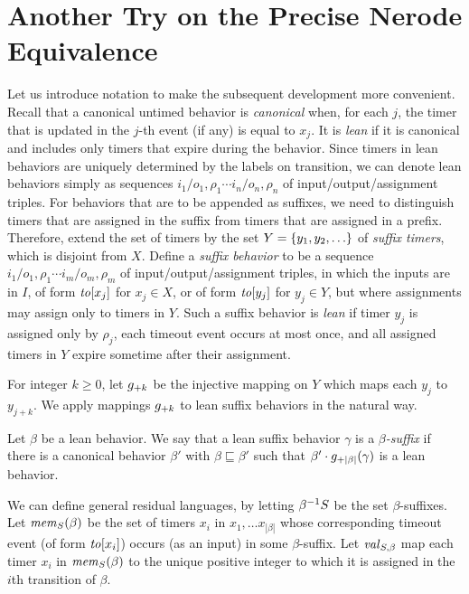 \section{Another Try on the Precise Nerode Equivalence}

Let us introduce notation to make the subsequent development more convenient. 
Recall that a canonical untimed behavior is \emph{canonical} when, for each $j$,
the timer that is updated in the $j$-th event (if any) is equal to $x_j$.
It is {\em lean} if it is canonical and
includes only timers that expire during the behavior. 
Since timers in lean behaviors are uniquely determined by the labels on
transition, we can denote lean behaviors simply as sequences
$i_1/o_1,\rho_1 \cdots i_n/o_n,\rho_n$ of input/output/assignment triples.
For behaviors that are to be appended as suffixes, we need to distinguish
timers that are assigned in the suffix from timers that are assigned in a prefix.
Therefore, extend the set of timers by the set $Y = \lbrace y_1,y_2,\ldots\rbrace$ of
{\em suffix timers}, which is disjoint from $X$.
Define a {\em suffix behavior} to be a sequence
$i_1/o_1,\rho_1 \cdots i_m/o_m,\rho_m$ of input/output/assignment triples,
in which the inputs are in $I$, of form $\mathit{to}[x_j]$ for $x_j \in X$, or
of form $\mathit{to}[y_j]$ for $y_j \in Y$, but where assignments may assign only
to timers in $Y$. Such a suffix behavior is {\em lean} if
timer $y_j$ is assigned only by $\rho_j$, each timeout event occurs at most once, and all assigned timers in $Y$ expire sometime after their assignment.

For integer $k \geq 0$, let $g_{+{k}}$ be the injective mapping on
$Y$ which maps each $y_j$ to $y_{j+k}$.  We apply mappings $g_{+{k}}$ to
lean suffix behaviors in the natural way.

Let $\beta$ be a lean behavior. We say that 
a lean suffix behavior $\gamma$ is a {\em $\beta$-suffix} if
there is a canonical behavior $\beta'$ with $\beta \sqsubseteq \beta'$ such that
$\beta'\cdot g_{+{|\beta|}}(\gamma)$ is a lean behavior.

We can define general residual languages, by letting
${\beta}^{-1}{S}$ be the set $\beta$-suffixes.
Let $\mathit{mem}_{S}(\beta)$ be the set of timers $x_i$ in
$x_1 , \ldots x_{|\beta|}$ whose corresponding timeout event
(of form $\mathit{to}[x_i]$) occurs (as an input) in some $\beta$-suffix.
Let $\mathit{val}_{S,\beta}$ map each timer $x_i$ in
$\mathit{mem}_{S}(\beta)$ to the unique positive integer to which it
is assigned in the $i$th transition of $\beta$.

